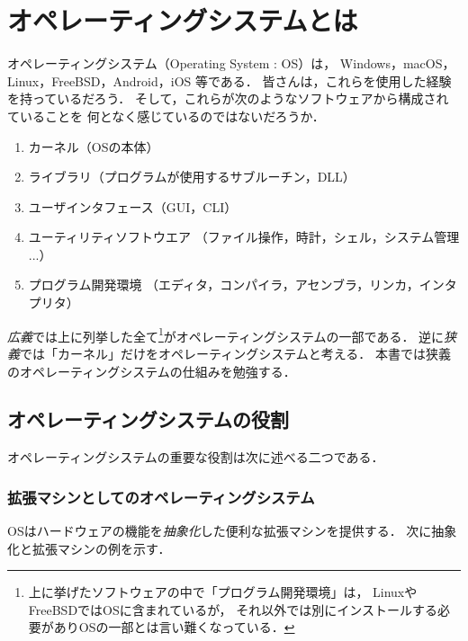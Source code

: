 \chapter{オペレーティングシステムとは}

オペレーティングシステム（Operating System : OS）は，
Windows，macOS，Linux，FreeBSD，Android，iOS
等である．
皆さんは，これらを使用した経験を持っているだろう．
そして，これらが次のようなソフトウェアから構成されていることを
何となく感じているのではないだろうか．

\begin{enumerate}
\item カーネル（OSの本体）
\item ライブラリ（プログラムが使用するサブルーチン，DLL）
\item ユーザインタフェース（GUI，CLI）
\item ユーティリティソフトウエア
  （ファイル操作，時計，シェル，システム管理 ...）
\item プログラム開発環境
  （エディタ，コンパイラ，アセンブラ，リンカ，インタプリタ）
\end{enumerate}

\emph{広義}では上に列挙した全て\footnote{
  上に挙げたソフトウェアの中で「プログラム開発環境」は，
  LinuxやFreeBSDではOSに含まれているが，
  それ以外では別にインストールする必要がありOSの一部とは言い難くなっている．
}がオペレーティングシステムの一部である．
逆に\emph{狭義}では「カーネル」だけをオペレーティングシステムと考える．
本書では狭義のオペレーティングシステムの仕組みを勉強する．

\section{オペレーティングシステムの役割}
\label{osRole}

オペレーティングシステムの重要な役割は次に述べる二つである．

\subsection{拡張マシンとしてのオペレーティングシステム}
\label{abstruction}

OSはハードウェアの機能を\emph{抽象化}した便利な拡張マシンを提供する．
次に抽象化と拡張マシンの例を示す．

